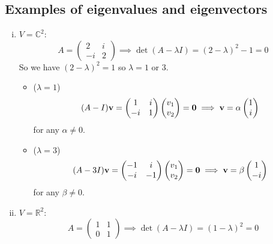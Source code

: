 \subsection{Examples of eigenvalues and eigenvectors}
\begin{enumerate}[(i)]
	\item \(V = \mathbb C^2\):
	      \[
		      A = \begin{pmatrix}
			      2 & i \\ -i & 2
		      \end{pmatrix} \implies \det(A - \lambda I) = (2-\lambda)^2 - 1 = 0
	      \]
	      So we have \((2 - \lambda)^2 = 1\) so \(\lambda = 1\) or 3.
	      \begin{itemize}
		      \item (\(\lambda = 1\))
		            \[
			            (A - I)\vb v = \begin{pmatrix}
				            1 & i \\ -i & 1
			            \end{pmatrix}\begin{pmatrix}
				            v_1 \\ v_2
			            \end{pmatrix} = \vb 0 \implies \vb v = \alpha\begin{pmatrix}
				            1 \\ i
			            \end{pmatrix}
		            \]
		            for any \(\alpha \neq 0\).
		      \item (\(\lambda = 3\))
		            \[
			            (A - 3I)\vb v = \begin{pmatrix}
				            -1 & i \\ -i & -1
			            \end{pmatrix}\begin{pmatrix}
				            v_1 \\ v_2
			            \end{pmatrix} = \vb 0 \implies \vb v = \beta\begin{pmatrix}
				            1 \\ -i
			            \end{pmatrix}
		            \]
		            for any \(\beta \neq 0\).
	      \end{itemize}
	\item \(V = \mathbb R^2\):
	      \[
		      A = \begin{pmatrix}
			      1 & 1 \\ 0 & 1
		      \end{pmatrix} \implies \det(A - \lambda I) = (1-\lambda)^2 = 0
\]
\end{enumerate}
